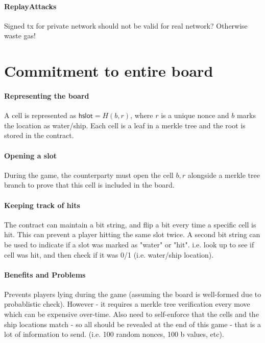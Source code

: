 \documentclass{llncs}
\newcommand{\hslot}{\mathsf{hslot}}
\begin{document}
\paragraph{ReplayAttacks} Signed tx for private network should not be valid for real network? Otherwise waste gas! 
 
\appendix

\section{Commitment to entire board}

\paragraph{Representing the board}

A cell is represented as $\hslot = H(b, r)$, where  $r$ is a unique nonce and $b$ marks the location as water/ship. 
Each cell is a leaf in a merkle tree and the root is stored in the contract. 

\paragraph{Opening a slot} 

During the game, the counterparty must open the cell $b,r$ alongside a merkle tree branch to prove that this cell is included in the board. 

\paragraph{Keeping track of hits} The contract can maintain a bit string, and flip a bit every time a specific cell is hit. This can prevent a player hitting the same slot twice. A second bit string can be used to indicate if a slot was marked as "water" or "hit". i.e. look up to see if cell was hit, and then check if it was 0/1 (i.e. water/ship location). 

\paragraph{Benefits and Problems} Prevents players lying during the game (assuming the board is well-formed due to probablistic check). However - it requires a merkle tree verification every move which can be expensive over-time. Also need to self-enforce that the cells and the ship locations match - so all should be revealed at the end of this game - that is a lot of information to send. (i.e. 100 random nonces, 100 b values, etc). 
\end{document}
